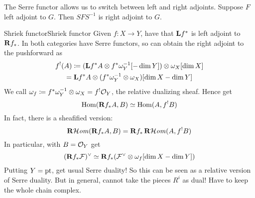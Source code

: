 

The Serre functor allows us to switch between left and right adjoints. Suppose $F$ left adjoint to $G$. Then $SFS^{-1}$ is right adjoint to $G$.


\begin{example}{Shriek functor}{Shriek functor}
Given $f:X\to Y$, have that $\mathbf{L} f^*$ is left adjoint to $\mathbf{R} f_*$. In both categories have Serre functors, so can obtain the right adjoint to the pushforward as
\begin{gather*}
    f^!(A) \coloneqq (\mathbf{L} f^*A\otimes f^*\omega_Y^{-1}[-\dim Y])
            \otimes \omega_X[\dim X] \\
        = \mathbf{L} f^*A\otimes(f^*\omega_Y^{-1}\otimes\omega_X)[\dim X -\dim Y]
\end{gather*}
We call $\omega_f\coloneqq f^*\omega_Y^{-1}\otimes\omega_X=f^!\mathcal{O}_Y$, the relative dualizing sheaf. Hence get
\begin{equation*}
    \operatorname{Hom}(\mathbf{R} f_*A,B)\simeq \operatorname{Hom}(A,f^!B)
\end{equation*}
In fact, there is a sheafified version:
\begin{equation*}
    \operatorname{\mathbf{R}\mathcal{H}\mathit{om}}(\mathbf{R} f_*A,B)=\mathbf{R} f_*\operatorname{\mathbf{R}\mathcal{H}\mathit{om}}(A,f^!B)
\end{equation*}
In particular, with $B=\mathcal{O}_Y$ get
\begin{equation*}
    (\mathbf{R} f_*\mathcal{F})^\vee
        \simeq \mathbf{R} f_*(\mathcal{F}^\vee\otimes\omega_f[\dim X-\dim Y])
\end{equation*}
Putting $Y=\mathrm{pt}$, get usual Serre duality! So this can be seen as a relative version of Serre duality. But in general, cannot take the pieces $R^i$ as dual! Have to keep the whole chain complex.
\end{example}

